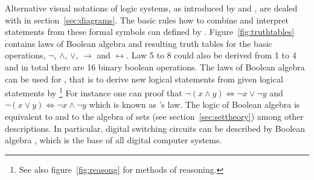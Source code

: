 \noindent Alternative visual notations of logic systems, as introduced by
\textcite{Euler1768} and \textcite{Venn1880}, are dealed with in
section~\ref{sec:diagrams}.  The basic rules how to combine and interpret
statements from these formal symbols can defined by .
Figure~\ref{fig:truthtables} contains laws of Boolean algebra and resulting
truth tables for the basic operations, $\lnot$, $\land$, $\lor$, $\to$ and
$\leftrightarrow$. Law 5 to 8 could also be derived from 1 to 4 and in total
there are 16 binary boolean operations.  The laws of Boolean algebra can be
used for , that is to derive new logical statements from given
logical statements by \footnote{See also
figure~\ref{fig:reasong} for methods of reasoning.} For instance one can proof
that $\lnot(x \land y) \Leftrightarrow \lnot x \lor \lnot y$ and $\lnot(x \lor
y) \Leftrightarrow \lnot x \land \lnot y$ which is known as
's law.  The logic of Boolean algebra is equivalent
to  and to the algebra of sets (see
section~\ref{sec:settheory}) among other descriptions. In particular, digital
switching circuits can be described by Boolean algebra \cite{Shannon1938},
which is the base of all digital computer systems.

